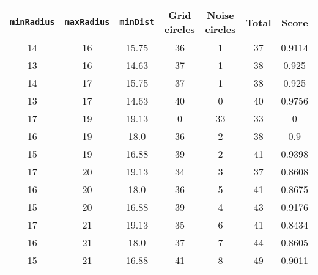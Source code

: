 \documentclass[letterpaper, 12pt]{article}
\begin{document}
\begin{longtable}{|c|c|c|c|c|c|c|}
\hline
\textbf{\texttt{minRadius}} & \textbf{\texttt{maxRadius}} & \textbf{\texttt{minDist}} & \textbf{Grid circles} & \textbf{Noise circles} & \textbf{Total} & \textbf{Score} \\
\hline
14 & 16 & 15.75 & 36 & 1 & 37 & 0.9114 \\
\hline
13 & 16 & 14.63 & 37 & 1 & 38 & 0.925 \\
\hline
14 & 17 & 15.75 & 37 & 1 & 38 & 0.925 \\
\hline
13 & 17 & 14.63 & 40 & 0 & 40 & 0.9756 \\
\hline
17 & 19 & 19.13 & 0 & 33 & 33 & 0 \\
\hline
16 & 19 & 18.0 & 36 & 2 & 38 & 0.9 \\
\hline
15 & 19 & 16.88 & 39 & 2 & 41 & 0.9398 \\
\hline
17 & 20 & 19.13 & 34 & 3 & 37 & 0.8608 \\
\hline
16 & 20 & 18.0 & 36 & 5 & 41 & 0.8675 \\
\hline
15 & 20 & 16.88 & 39 & 4 & 43 & 0.9176 \\
\hline
17 & 21 & 19.13 & 35 & 6 & 41 & 0.8434 \\
\hline
16 & 21 & 18.0 & 37 & 7 & 44 & 0.8605 \\
\hline
15 & 21 & 16.88 & 41 & 8 & 49 & 0.9011 \\
\hline
\end{longtable}
\end{document}
